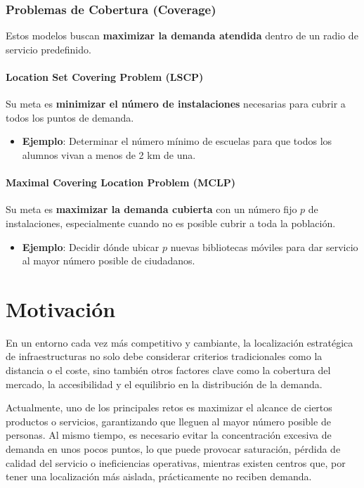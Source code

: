 \documentclass[12pt,a4paper]{book}
\begin{document}
\subsubsection{Problemas de Cobertura (Coverage)}
Estos modelos buscan \textbf{maximizar la demanda atendida} dentro de un radio de servicio predefinido.

\paragraph{Location Set Covering Problem (LSCP)} Su meta es \textbf{minimizar el número de instalaciones} necesarias para cubrir a todos los puntos de demanda.
\begin{itemize}
    \item \textbf{Ejemplo}: Determinar el número mínimo de escuelas para que todos los alumnos vivan a menos de 2 km de una.
\end{itemize}

\paragraph{Maximal Covering Location Problem (MCLP)} Su meta es \textbf{maximizar la demanda cubierta} con un número fijo $p$ de instalaciones, especialmente cuando no es posible cubrir a toda la población.
\begin{itemize}
    \item \textbf{Ejemplo}: Decidir dónde ubicar $p$ nuevas bibliotecas móviles para dar servicio al mayor número posible de ciudadanos.
\end{itemize}

\section{Motivación}
En un entorno cada vez más competitivo y cambiante, la localización estratégica de infraestructuras no solo debe considerar criterios tradicionales como la distancia o el coste, sino también otros factores clave como la cobertura del mercado, la accesibilidad y el equilibrio en la distribución de la demanda.

Actualmente, uno de los principales retos es maximizar el alcance de ciertos productos o servicios, garantizando que lleguen al mayor número posible de personas. Al mismo tiempo, es necesario evitar la concentración excesiva de demanda en unos pocos puntos, lo que puede provocar saturación, pérdida de calidad del servicio o ineficiencias operativas, mientras existen centros que, por tener una localización más aislada, prácticamente no reciben demanda.
\end{document}
